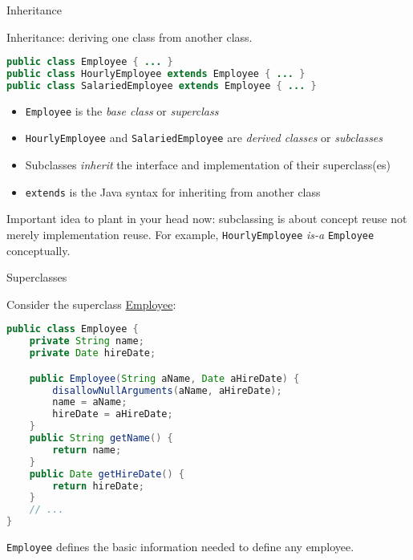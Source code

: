 \documentclass{beamer}
\newcommand{\code}{http://www.cc.gatech.edu/~simpkins/teaching/gatech/cs1331/code}
\begin{document}
\begin{frame}[fragile]{Inheritance}


Inheritance:  deriving one class from another class.
\begin{lstlisting}[language=Java]
public class Employee { ... }
public class HourlyEmployee extends Employee { ... }
public class SalariedEmployee extends Employee { ... }
\end{lstlisting}

\begin{itemize}
\item {\tt Employee} is the {\it base class} or {\it superclass}
\item {\tt HourlyEmployee} and {\tt SalariedEmployee} are {\it derived classes} or {\it subclasses}
\item Subclasses {\it inherit} the interface and implementation of their superclass(es)
\item {\tt extends} is the Java syntax for inheriting from another class
\end{itemize}

Important idea to plant in your head now: subclassing is about concept reuse not merely implementation reuse.  For example, {\tt HourlyEmployee} {\it is-a} {\tt Employee} conceptually.  

\end{frame}

\begin{frame}[fragile]{Superclasses}


Consider the superclass \href{\code/Employee.java}{Employee}:
\begin{lstlisting}[language=Java]
public class Employee {
    private String name;
    private Date hireDate;

    public Employee(String aName, Date aHireDate) {
        disallowNullArguments(aName, aHireDate);
        name = aName;
        hireDate = aHireDate;
    }
    public String getName() {
        return name;
    }
    public Date getHireDate() {
        return hireDate;
    }
    // ...
}
\end{lstlisting}

{\tt Employee} defines the basic information needed to define any employee.

\end{frame}
\end{document}
